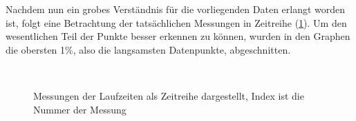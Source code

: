 \documentclass[
	12pt,
	a4paper,
	BCOR10mm,
	DIV14,
	listof=totoc,
	bibliography=totoc,
	headsepline
]{scrreprt}
\begin{document}
Nachdem nun ein grobes Verständnis für die vorliegenden Daten erlangt worden ist, folgt eine Betrachtung der tatsächlichen Messungen in Zeitreihe (\ref{Laufzeiten_Zeitreihe}). Um den wesentlichen Teil der Punkte besser erkennen zu können, wurden in den Graphen die obersten 1\%, also die langsamsten Datenpunkte, abgeschnitten.

\begin{figure}
	\hfill
	\\
	\hfill
	\caption{Messungen der Laufzeiten als Zeitreihe dargestellt, Index ist die Nummer der Messung}
	\label{Laufzeiten_Zeitreihe}
\end{figure} 
\end{document}
